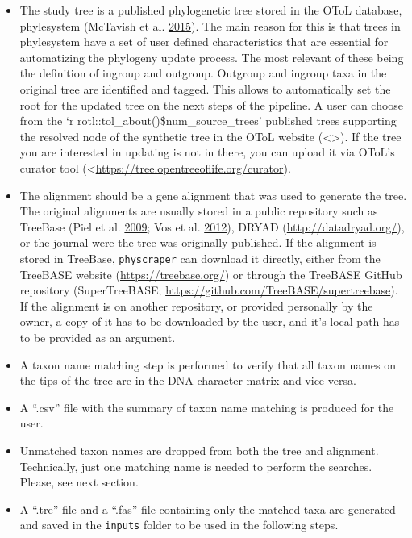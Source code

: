 \documentclass[]{article}
\providecommand{\tightlist}{%
  \setlength{\itemsep}{0pt}\setlength{\parskip}{0pt}}
\begin{document}
\begin{itemize}
\tightlist
\item
  The study tree is a published phylogenetic tree stored in the OToL database, phylesystem (McTavish et al. \protect\hyperlink{ref-mctavish2015phylesystem}{2015}). The main
  reason for this is that trees in phylesystem have a set of user defined characteristics
  that are essential for automatizing the phylogeny update process. The most relevant of these being the definition of ingroup and outgroup. Outgroup and ingroup taxa in the original tree are identified and tagged. This allows to automatically set the root for the updated tree on the next steps of the pipeline.
  A user can choose from the `r rotl::tol\_about()\$num\_source\_trees' published trees supporting the resolved node of the synthetic tree in the OToL website (\textless{}\textgreater{}). If the tree you are interested in updating is not in there, you can upload it via OToL's curator tool (\textless{}\url{https://tree.opentreeoflife.org/curator}).
\item
  The alignment should be a gene alignment that was used to generate the tree. The original
  alignments are usually stored in a public repository such as TreeBase (Piel et al. \protect\hyperlink{ref-piel2009treebase}{2009}; Vos et al. \protect\hyperlink{ref-vos2012nexml}{2012}),
  DRYAD (\url{http://datadryad.org/}), or the journal were the tree was originally published.
  If the alignment is stored in TreeBase, \texttt{physcraper} can download it directly,
  either from the TreeBASE website (\url{https://treebase.org/})
  or through the TreeBASE GitHub repository (SuperTreeBASE; \url{https://github.com/TreeBASE/supertreebase}).
  If the alignment is on another repository, or provided personally by the owner, a copy of it has to be
  downloaded by the user, and it's local path has to be provided as an argument.
\item
  A taxon name matching step is performed to verify that all taxon names on the tips
  of the tree are in the DNA character matrix and vice versa.
\item
  A ``.csv'' file with the summary of taxon name matching is produced for the user.
\item
  Unmatched taxon names are dropped from both the tree and alignment.
  Technically, just one matching name is needed to perform the searches. Please, see next section.
\item
  A ``.tre'' file and a ``.fas'' file containing only the matched taxa are generated and saved in the \texttt{inputs} folder to be used in the following steps.
\end{itemize}
\end{document}
